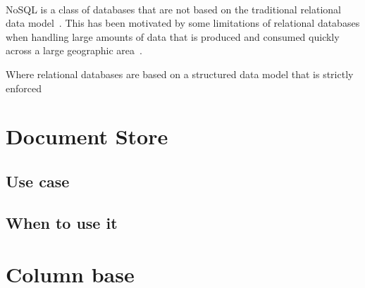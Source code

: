 \documentclass{CRPITStyle}
\renewcommand{\cite}{\citep}
\begin{document}
\paragraph{} NoSQL is a class of databases that are not based on the
traditional relational data model~\cite{nosql_db}.
This has been motivated by some limitations of relational databases
when handling large amounts of data that is produced and consumed
quickly across a large geographic area~\cite{nosql_db}.

Where relational databases are based on a structured
data model that is strictly enforced~\cite{relational_db}










\section{Document Store}


\subsection{Use case}

\subsection{When to use it}


\section{Column base}
\end{document}
